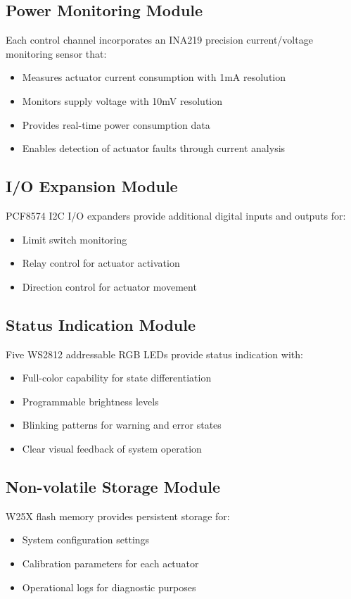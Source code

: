 \documentclass[12pt,a4paper,twoside,openright]{book}
\begin{document}
\subsection{Power Monitoring Module}
Each control channel incorporates an INA219 precision current/voltage monitoring sensor that:
\begin{itemize}
    \item Measures actuator current consumption with 1mA resolution
    \item Monitors supply voltage with 10mV resolution
    \item Provides real-time power consumption data
    \item Enables detection of actuator faults through current analysis
\end{itemize}

\subsection{I/O Expansion Module}
PCF8574 I2C I/O expanders provide additional digital inputs and outputs for:
\begin{itemize}
    \item Limit switch monitoring
    \item Relay control for actuator activation
    \item Direction control for actuator movement
\end{itemize}

\subsection{Status Indication Module}
Five WS2812 addressable RGB LEDs provide status indication with:
\begin{itemize}
    \item Full-color capability for state differentiation
    \item Programmable brightness levels
    \item Blinking patterns for warning and error states
    \item Clear visual feedback of system operation
\end{itemize}

\subsection{Non-volatile Storage Module}
W25X flash memory provides persistent storage for:
\begin{itemize}
    \item System configuration settings
    \item Calibration parameters for each actuator
    \item Operational logs for diagnostic purposes
\end{itemize}
\end{document}
